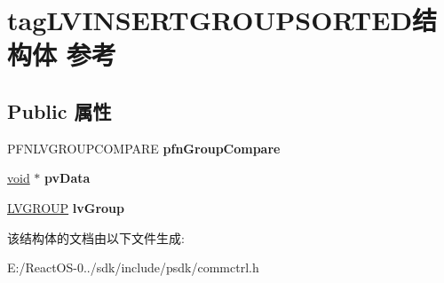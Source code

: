 \hypertarget{structtag_l_v_i_n_s_e_r_t_g_r_o_u_p_s_o_r_t_e_d}{}\section{tag\+L\+V\+I\+N\+S\+E\+R\+T\+G\+R\+O\+U\+P\+S\+O\+R\+T\+E\+D结构体 参考}
\label{structtag_l_v_i_n_s_e_r_t_g_r_o_u_p_s_o_r_t_e_d}
\subsection*{Public 属性}
\begin{DoxyCompactItemize}
\item 
\mbox{\label{structtag_l_v_i_n_s_e_r_t_g_r_o_u_p_s_o_r_t_e_d_acca8bc4adce750063e51820d70123dbe}} 
P\+F\+N\+L\+V\+G\+R\+O\+U\+P\+C\+O\+M\+P\+A\+RE {\bfseries pfn\+Group\+Compare}
\item 
\mbox{\label{structtag_l_v_i_n_s_e_r_t_g_r_o_u_p_s_o_r_t_e_d_aa433cd7caebdf4c99b4bb88b92cdfd35}} 
\hyperlink{interfacevoid}{void} $\ast$ {\bfseries pv\+Data}
\item 
\mbox{\label{structtag_l_v_i_n_s_e_r_t_g_r_o_u_p_s_o_r_t_e_d_a13025d0615234231f8c7f57cfd4cfdd4}} 
\hyperlink{structtag_l_v_g_r_o_u_p}{L\+V\+G\+R\+O\+UP} {\bfseries lv\+Group}
\end{DoxyCompactItemize}


该结构体的文档由以下文件生成\+:\begin{DoxyCompactItemize}
\item 
E\+:/\+React\+O\+S-\/0../sdk/include/psdk/commctrl.\+h\end{DoxyCompactItemize}
